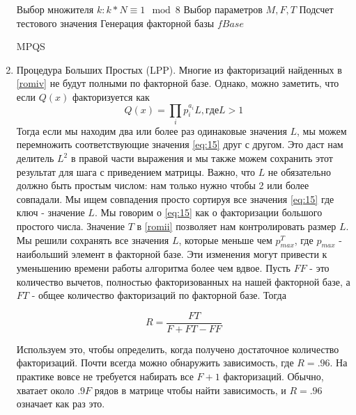\documentclass[a4paper,12pt]{report}
\begin{document}
\begin{enumerate}[label=\roman*]
\begin{algorithm}[H]
\SetAlgoLined
{}
Выбор множителя $k: k*N \equiv 1 \mod 8$\;
Выбор параметров $M, F, T$\;
Подсчет тестового значения\;
Генерация факторной базы $fBase$\;
\caption{MPQS}
\end{algorithm}
	\item Процедура Больших Простых (LPP). Многие из факторизаций найденных в \ref{romiv} не будут полными по факторной базе. Однако, можно заметить, что если $Q(x)$ факторизуется как \label{romv}
\begin{equation}\label{eq:15}
Q(x) = \prod_{i}p_i^{a_i}L, где L > 1
\end{equation}
		Тогда если мы находим два или более раз одинаковые значения $L$, мы можем перемножить соответствующие значения \eqref{eq:15} друг с другом. Это даст нам делитель $L^2$ в правой части выражения и мы также можем сохранить этот результат для шага с приведением матрицы. Важно, что $L$ не обязательно должно быть простым числом: нам только нужно чтобы 2 или более совпадали. Мы ищем совпадения просто сортируя все значения \eqref{eq:15} где ключ - значение $L$. Мы говорим о \eqref{eq:15} как о факторизации большого простого числа. Значение $T$ в \ref{romii} позволяет нам контролировать размер $L$. Мы решили сохранять все значения $L$, которые меньше чем $p_{max}^T$, где $p_{max}$ - наибольший элемент в факторной базе. Эти изменения могут привести к уменьшению времени работы алгоритма более чем вдвое.
Пусть $FF$ - это количество вычетов, полностью факторизованных на нашей факторной базе, а $FT$ - общее количество факторизаций по факторной базе. Тогда

\begin{equation}\label{eq:16}
R = \frac{FT}{F+FT-FF}
\end{equation}

Используем это, чтобы определить, когда получено достаточное количество факторизаций. Почти всегда можно обнаружить зависимость, где $R = .96$. На практике вовсе не требуется набирать все $F + 1$ факторизаций. Обычно, хватает около $.9F$ рядов в матрице чтобы найти зависимость, и $R = .96$ означает как раз это.


\end{enumerate}
\end{document}
